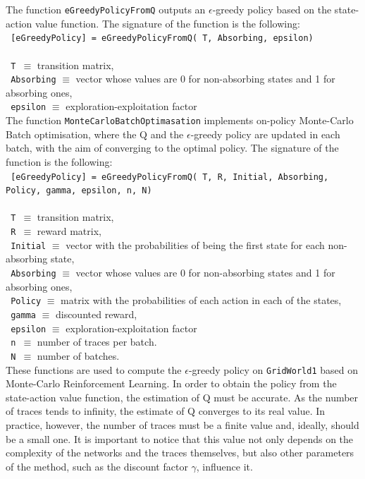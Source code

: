 \documentclass[11pt]{article}   	%
\begin{document}
The function \texttt{eGreedyPolicyFromQ} outputs an $\epsilon$-greedy policy based on the state-action value function. The signature of the function is the following:\\

\noindent\texttt{ [eGreedyPolicy] = eGreedyPolicyFromQ( T, Absorbing, epsilon)} \\
\\
\texttt{ T }$\equiv$ transition matrix,\\
\texttt{ Absorbing} $\equiv$ vector whose values are 0 for non-absorbing states and 1 for absorbing ones,\\
\texttt{ epsilon} $\equiv$ exploration-exploitation factor\\
 
The function \texttt{MonteCarloBatchOptimasation} implements on-policy Monte-Carlo Batch optimisation, where the Q and the $\epsilon$-greedy policy are updated in each batch, with the aim of converging to the optimal policy. The signature of the function is the following:\\

\noindent\texttt{ [eGreedyPolicy] = eGreedyPolicyFromQ( T, R,  Initial, Absorbing, Policy, gamma, epsilon, n, N)} \\
\\
\texttt{ T }$\equiv$ transition matrix,\\
\texttt{ R }$\equiv$ reward matrix,\\
\texttt{ Initial} $\equiv$ vector with the probabilities of being the first state for each non-absorbing state,\\
\texttt{ Absorbing} $\equiv$ vector whose values are 0 for non-absorbing states and 1 for absorbing ones,\\
\texttt{ Policy} $\equiv$ matrix with the probabilities of each action in each of the states,\\
\texttt{ gamma} $\equiv$ discounted reward,\\
\texttt{ epsilon} $\equiv$ exploration-exploitation factor\\
\texttt{ n }$\equiv$ number of traces per batch.\\
\texttt{ N }$\equiv$ number of batches.\\ 

These functions are used to compute the $\epsilon$-greedy policy on \texttt{GridWorld1} based on Monte-Carlo Reinforcement Learning. In order to obtain the policy from the state-action value function, the estimation of Q must be accurate. As the number of traces tends to infinity, the estimate of Q converges to its real value. In practice, however, the number of traces must be a finite value and, ideally, should be a small one. It is important to notice that this value not only depends on the complexity of the networks and the traces themselves, but also other parameters of the method, such as the discount factor $\gamma$, influence it.
\end{document}
